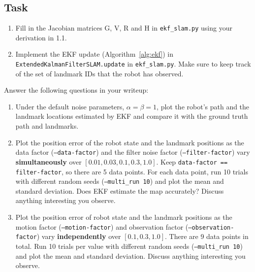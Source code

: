 \documentclass[tp]{lcc}
\begin{document}
\subsection*{Task}
\begin{enumerate}
    \item Fill in the Jacobian matrices G, V, R and H in \texttt{ekf\_slam.py} using your derivation in 1.1.
    \item Implement the EKF update (Algorithm~\ref{alg:ekf}) in \texttt{ExtendedKalmanFilterSLAM.update} in \texttt{ekf\_slam.py}. Make sure to keep track of the set of landmark IDs that the robot has observed.
\end{enumerate}

Answer the following questions in your writeup:
\begin{enumerate}
    \item Under the default noise parameters, $\alpha=\beta=1$, plot the robot's path and the landmark locations estimated by EKF and compare it with the ground truth path and landmarks.
    \item Plot the position error of the robot state and the landmark positions as the data factor (\texttt{--data-factor}) and the filter noise factor (\texttt{--filter-factor}) vary \textbf{simultaneously} over $[0.01,0.03,0.1,0.3,1.0]$. Keep \texttt{data-factor == filter-factor}, so there are 5 data points. For each data point, run 10 trials with different random seeds (\texttt{--multi\_run 10}) and plot the mean and standard deviation. Does EKF estimate the map accurately? Discuss anything interesting you observe.
    \item Plot the position error of robot state and the landmark positions as the motion factor (\texttt{--motion-factor}) and observation factor (\texttt{--observation-factor}) vary \textbf{independently} over $[0.1,0.3,1.0]$. There are 9 data points in total. Run 10 trials per value with different random seeds (\texttt{--multi\_run 10}) and plot the mean and standard deviation. Discuss anything interesting you observe.
\end{enumerate}


\printbibliography
\end{document}
